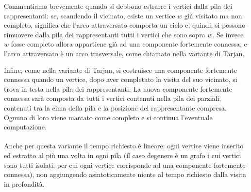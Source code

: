 Commentiamo brevemente quando si debbono estrarre i vertici dalla pila
dei rappresentanti: se, scandendo il vicinato, esiste un vertice $w$
gi\`a visitato ma non completo, significa che l'arco attraversato
comporta un ciclo e, quindi, si possono rimuovere dalla pila dei
rappresentanti tutti i vertici che sono sopra $w$. Se invece $w$ fosse
completo allora appartiene gi\`a ad una componente fortemente
connessa, e l'arco attraversato \`e un arco trasversale, come chiamato
nella variante di Tarjan.

Infine, come nella variante di Tarjan, si costruisce una componente
fortemente connessa quando un vertice, dopo aver completato la visita
del suo vicinato, si trova in testa nella pila dei rappresentanti. La
nuova componente fortemente connessa sar\`a composta da tutti i
vertici contenuti nella pila dei parziali, contenuti tra la cima della
pila e la posizione del rappresentante compresa. Ognuno di loro viene
marcato come completo e si continua l'eventuale computazione.
\\\\
Anche per questa variante il tempo richiesto \`e lineare: ogni vertice
viene inserito ed estratto al pi\`u una volta in ogni pila (il caso
degenere \`e un grafo i cui vertici sono tutti isolati, per cui ogni
vertice corrisponde ad una componente fortemente connessa), non
aggiungendo asintoticamente niente al tempo richiesto dalla visita in
profondit\`a.




